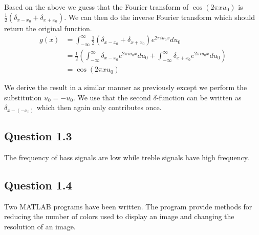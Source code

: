 \documentclass[a4paper, 10pt, final]{article}
\begin{document}
Based on the above we guess that the Fourier transform of $\cos(2\pi
xu_0)$ is $\frac{1}{2}(\delta_{x - x_0} + \delta_{x + x_0})$. We can
then do the inverse Fourier transform which should return the original
function.
\begin{align*}
    g(x) & = \int_{-\infty}^{\infty}{\frac{1}{2}(\delta_{x - x_0} +
    \delta_{x + x_0})e^{2\pi iu_0x}du_0}\\
    & = \frac{1}{2}\left( \int_{-\infty}^{\infty}{\delta_{x -
    x_0}e^{2\pi iu_0x}du_0} + \int_{-\infty}^{\infty}{\delta_{x +
    x_0}e^{2\pi iu_0x}du_0}\right)\\
    & = \cos(2\pi xu_0)
\end{align*}

We derive the result in a similar manner as previously except we
perform the substitution $u_0 = - u_0$. We use that the second
$\delta$-function can be written as $\delta_{x - (-x_0)}$ which then
again only contributes once.

\subsection*{Question 1.3}
The frequency of bass signals are low while treble signals have high
frequency.

\subsection*{Question 1.4}
Two MATLAB programs have been written. The program provide methods for
reducing the number of colors used to display an image and changing the
resolution of an image.
\end{document}
